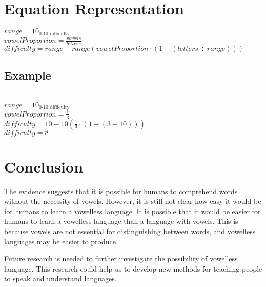 \documentclass{article}
\begin{document}
\section{Equation Representation}
$range=10_{\text{0-10 difficulty}}$ \\
$vowelProportion=\frac{vowels}{letters}$ \\
$difficulty=range-range(vowelProportion \cdot (1-(letters \div range)))$ \\

\subsection{Example}
 \\
$range=10_{\text{0-10 difficulty}}$ \\
$vowelProportion=\frac{1}{3}$ \\
$difficulty=10-10(\frac{1}{3} \cdot (1-(3 \div 10)))$ \\
$difficulty=8$ \\

\section{Conclusion}

The evidence suggests that it is possible for humans to comprehend words without the necessity of vowels. However, it is still not clear how easy it would be for humans to learn a vowelless language. It is possible that it would be easier for humans to learn a vowelless language than a language with vowels. This is because vowels are not essential for distinguishing between words, and vowelless languages may be easier to produce.

Future research is needed to further investigate the possibility of vowelless language. This research could help us to develop new methods for teaching people to speak and understand languages.



\end{document}
